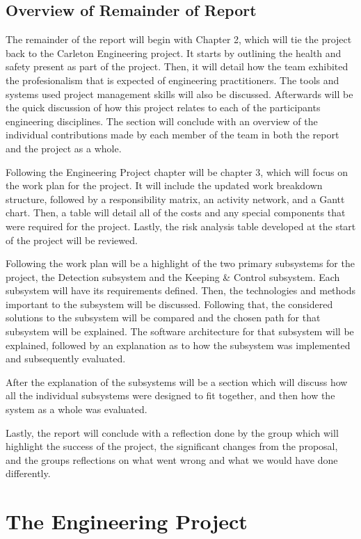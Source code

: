 \documentclass[titlepage]{article}
\begin{document}
\subsection{Overview of Remainder of Report}

The remainder of the report will begin with Chapter 2, which will tie the project back to the Carleton Engineering project. It starts by outlining the health and safety present as part of the project.  Then, it will detail how the team exhibited the profesionalism that is expected of engineering practitioners. The tools and systems used project management skills will also be discussed. Afterwards will be the quick discussion of how this project relates to each of the participants engineering disciplines. The section will conclude with an overview of the individual contributions made by each member of the team in both the report and the project as a whole.

Following the Engineering Project chapter will be chapter 3, which will focus on the work plan for the project. It will include the updated work breakdown structure, followed by a responsibility matrix, an activity network, and a Gantt chart. Then, a table will detail all of the costs and any special components that were required for the project. Lastly, the risk analysis table developed at the start of the project will be reviewed.

Following the work plan will be a highlight of the two primary subsystems for the project, the Detection subsystem and the Keeping \& Control subsystem. Each subsystem will have its requirements defined. Then, the technologies and methods important to the subsystem will be discussed. Following that, the considered solutions to the subsystem will be compared and the chosen path for that subsystem will be explained. The software architecture for that subsystem will be explained, followed by an explanation as to how the subsystem was implemented and subsequently evaluated.

After the explanation of the subsystems will be a section which will discuss how all the individual subsystems were designed to fit together, and then how the system as a whole was evaluated.

Lastly, the report will conclude with a reflection done by the group which will highlight the success of the project, the significant changes from the proposal, and the groups reflections on what went wrong and what we would have done differently.

\section{The Engineering Project}
\end{document}
